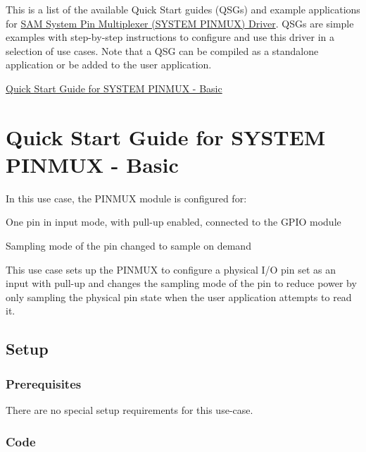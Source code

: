 This is a list of the available Quick Start guides (Q\+S\+Gs) and example applications for \hyperlink{group__asfdoc__sam0__system__pinmux__group}{S\+A\+M System Pin Multiplexer (S\+Y\+S\+T\+E\+M P\+I\+N\+M\+U\+X) Driver}. Q\+S\+Gs are simple examples with step-\/by-\/step instructions to configure and use this driver in a selection of use cases. Note that a Q\+S\+G can be compiled as a standalone application or be added to the user application.


\begin{DoxyItemize}
\item \hyperlink{asfdoc_sam0_system_pinmux_basic_use_case}{Quick Start Guide for S\+Y\+S\+T\+E\+M P\+I\+N\+M\+U\+X -\/ Basic} 
\end{DoxyItemize}\hypertarget{asfdoc_sam0_system_pinmux_basic_use_case}{}\section{Quick Start Guide for S\+Y\+S\+T\+E\+M P\+I\+N\+M\+U\+X -\/ Basic}\label{asfdoc_sam0_system_pinmux_basic_use_case}
In this use case, the P\+I\+N\+M\+U\+X module is configured for\+: \begin{DoxyItemize}
\item One pin in input mode, with pull-\/up enabled, connected to the G\+P\+I\+O module \item Sampling mode of the pin changed to sample on demand\end{DoxyItemize}
This use case sets up the P\+I\+N\+M\+U\+X to configure a physical I/\+O pin set as an input with pull-\/up and changes the sampling mode of the pin to reduce power by only sampling the physical pin state when the user application attempts to read it.\hypertarget{asfdoc_sam0_system_pinmux_basic_use_case_asfdoc_sam0_system_pinmux_basic_use_case_setup}{}\subsection{Setup}\label{asfdoc_sam0_system_pinmux_basic_use_case_asfdoc_sam0_system_pinmux_basic_use_case_setup}
\hypertarget{asfdoc_sam0_system_pinmux_basic_use_case_asfdoc_sam0_system_pinmux_basic_use_case_setup_prereq}{}\subsubsection{Prerequisites}\label{asfdoc_sam0_system_pinmux_basic_use_case_asfdoc_sam0_system_pinmux_basic_use_case_setup_prereq}
There are no special setup requirements for this use-\/case.\hypertarget{asfdoc_sam0_system_pinmux_basic_use_case_asfdoc_sam0_system_pinmux_basic_use_case_setup_code}{}\subsubsection{Code}\label{asfdoc_sam0_system_pinmux_basic_use_case_asfdoc_sam0_system_pinmux_basic_use_case_setup_code}
